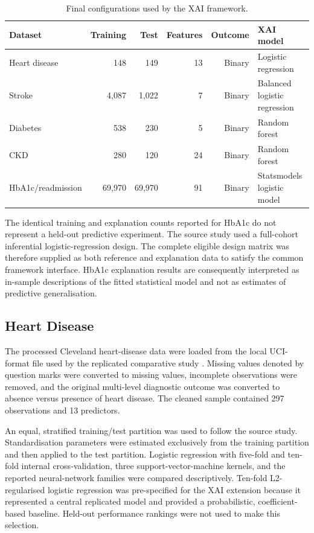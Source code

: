 \begin{table}[htbp]
    \centering
    \caption{Final configurations used by the XAI framework.}
    \label{tab:final-configurations}
    \begin{tabular}{lrrrrl}
        \hline
        Dataset & Training & Test & Features & Outcome & XAI model \\
        \hline
        Heart disease & 148 & 149 & 13 & Binary & Logistic regression \\
        Stroke & 4,087 & 1,022 & 7 & Binary & Balanced logistic regression \\
        Diabetes & 538 & 230 & 5 & Binary & Random forest \\
        CKD & 280 & 120 & 24 & Binary & Random forest \\
        HbA1c/readmission & 69,970 & 69,970 & 91 & Binary & Statsmodels logistic model \\
        \hline
    \end{tabular}
\end{table}

The identical training and explanation counts reported for HbA1c do not represent a held-out predictive experiment. The source study used a full-cohort inferential logistic-regression design. The complete eligible design matrix was therefore supplied as both reference and explanation data to satisfy the common framework interface. HbA1c explanation results are consequently interpreted as in-sample descriptions of the fitted statistical model and not as estimates of predictive generalisation.

\subsection{Heart Disease}

The processed Cleveland heart-disease data were loaded from the local UCI-format file used by the replicated comparative study \citep{khanna_heart_2015}. Missing values denoted by question marks were converted to missing values, incomplete observations were removed, and the original multi-level diagnostic outcome was converted to absence versus presence of heart disease. The cleaned sample contained 297 observations and 13 predictors.

An equal, stratified training/test partition was used to follow the source study. Standardisation parameters were estimated exclusively from the training partition and then applied to the test partition. Logistic regression with five-fold and ten-fold internal cross-validation, three support-vector-machine kernels, and the reported neural-network families were compared descriptively. Ten-fold L2-regularised logistic regression was pre-specified for the XAI extension because it represented a central replicated model and provided a probabilistic, coefficient-based baseline. Held-out performance rankings were not used to make this selection.

